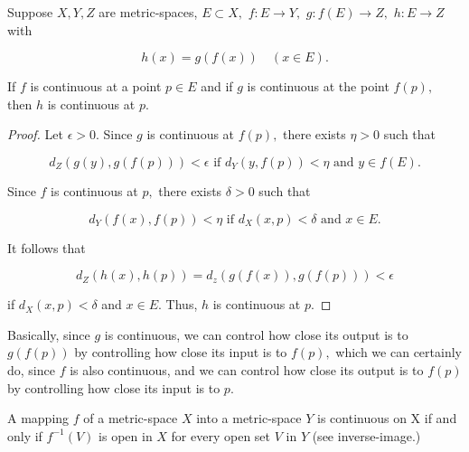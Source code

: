 \documentclass{article}
\begin{document}
\begin{theorem}\label{composition-of-continuous-functions-is-continuous}
Suppose $X, Y, Z$ are \@{metric-spaces}, $E \subset X,$ $f: E \to Y,$ $g: f(E) \to Z,$ $h: E \to Z$ with

\[ h(x) = g(f(x)) \quad (x \in E). \]

If $f$ is \@{continuous} at a point $p \in E$ and if $g$ is \@{continuous} at the point $f(p),$ then $h$ is \@{continuous} at $p.$
\end{theorem}

\begin{proof}
Let $\epsilon > 0.$ Since $g$ is \@{continuous} at $f(p),$ there exists $\eta > 0$ such that

\[ d_Z(g(y), g(f(p))) < \epsilon \text{ if } d_Y(y, f(p)) < \eta \text{ and } y \in f(E). \]

Since $f$ is \@{continuous} at $p,$ there exists $\delta > 0$ such that

\[ d_Y(f(x), f(p)) < \eta \text{ if } d_X(x, p) < \delta \text{ and } x \in E. \]

It follows that

\[ d_Z(h(x), h(p)) = d_z(g(f(x)), g(f(p))) < \epsilon \]

if $d_X(x, p) < \delta$ and $x \in E.$ Thus, $h$ is \@{continuous} at $p.$
\end{proof}

\begin{intuition}
Basically, since $g$ is \@{continuous}, we can control how close its output is to $g(f(p))$ by controlling how close its input is to $f(p),$ which we can certainly do, since $f$ is also continuous, and we can control how close its output is to $f(p)$ by controlling how close its input is to $p.$
\end{intuition}

\begin{theorem}\label{mapping-continuous-iff-inverse-images-of-open-sets-are-open}
A \@{mapping} $f$ of a \@{metric-space} $X$ into a \@{metric-space} $Y$ is \@{continuous} on X if and only if $f^{-1}(V)$ is \@{open} in $X$ for every \@{open} set $V$ in $Y$ (see \@{inverse-image}.)
\end{theorem}
\end{document}
